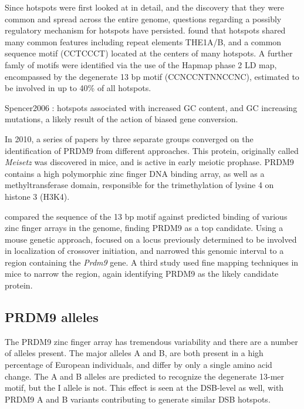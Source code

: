 Since hotspots were first looked at in detail, and the discovery that they were common and spread across the entire genome, questions regarding a possibly regulatory mechanism for hotspots have persisted.
\citet{Myers2005} found that hotspots shared many common features including repeat elements THE1A/B, and a common sequence motif (CCTCCCT) located at the centers of many hotspots.
A further famly of motifs were identified via the use of the Hapmap phase 2 LD map\cite{hapmap2007}, encompassed by the degenerate 13 bp motif (CCNCCNTNNCCNC)\cite{Myers2008}, estimated to be involved in up to 40\% of all hotspots.

Spencer2006 : hotspots associated with increased GC content, and GC increasing mutations, a likely result of the action of biased gene conversion.


In 2010, a series of papers by three separate groups converged on the identification of PRDM9 from different approaches.
This protein, originally called \textit{Meisetz} was discovered in mice, and is active in early meiotic prophase\cite{Hayashi2005}.
PRDM9 contains a high polymorphic zinc finger DNA binding array, as well as a methyltransferase domain, responsible for the trimethylation of lysine 4 on histone 3 (H3K4).

\citet{Myers2010} compared the sequence of the 13 bp motif against predicted binding of various zinc finger arrays in the genome, finding PRDM9 as a top candidate.
Using a mouse genetic approach, \citet{Baudat2010} focused on a locus previously determined to be involved in localization of crossover initiation\cite{Grey2009,Parvanov2009},
and narrowed this genomic interval to a region containing the \textit{Prdm9} gene.
A third study used fine mapping techniques in mice to narrow the region, again identifying PRDM9 as the likely candidate protein\cite{Parvanov2010}.

\subsection{PRDM9 alleles}

The PRDM9 zinc finger array has tremendous variability and there are a number of alleles present.
The major alleles A and B, are both present in a high percentage of European individuals, and differ by only a single amino acid change\cite{Baudat2010}.
The A and B alleles are predicted to recognize the degenerate 13-mer motif, but the I allele is not\cite{Baudat2010}.
This effect is seen at the DSB-level as well, with PRDM9 A and B variants contributing to generate similar DSB hotspots\cite{Pratto2014}.

